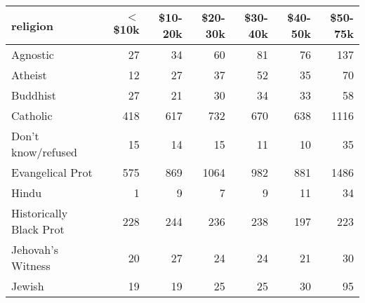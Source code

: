 \begin{tabular}{lrrrrrr}
  \toprule
 religion & $<$\$10k & \$10-20k & \$20-30k & \$30-40k & \$40-50k & \$50-75k \\ 
  \midrule
  Agnostic &  27 &  34 &  60 &  81 &  76 & 137 \\ 
  Atheist &  12 &  27 &  37 &  52 &  35 &  70 \\ 
  Buddhist &  27 &  21 &  30 &  34 &  33 &  58 \\ 
  Catholic & 418 & 617 & 732 & 670 & 638 & 1116 \\ 
  Don’t know/refused &  15 &  14 &  15 &  11 &  10 &  35 \\ 
  Evangelical Prot & 575 & 869 & 1064 & 982 & 881 & 1486 \\ 
  Hindu &   1 &   9 &   7 &   9 &  11 &  34 \\ 
  Historically Black Prot & 228 & 244 & 236 & 238 & 197 & 223 \\ 
  Jehovah's Witness &  20 &  27 &  24 &  24 &  21 &  30 \\ 
  Jewish &  19 &  19 &  25 &  25 &  30 &  95 \\ 
   \bottomrule
\end{tabular}

